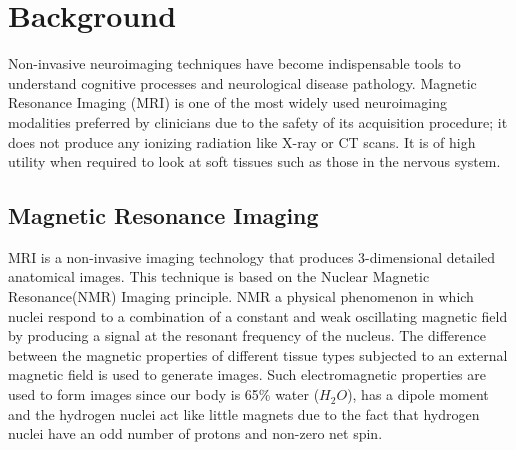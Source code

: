\documentclass[msthesis.tex]{subfiles}
\begin{document}
\chapter{Background}
Non-invasive neuroimaging techniques have become indispensable tools to understand cognitive processes and neurological disease pathology. Magnetic Resonance Imaging (MRI)  is one of the most widely used neuroimaging modalities preferred by clinicians due to the safety of its acquisition procedure; it does not produce any ionizing radiation like X-ray or CT scans. It is of high utility when required to look at soft tissues such as those in the nervous system.

\section{Magnetic Resonance Imaging}
MRI is a non-invasive imaging technology that produces 3-dimensional detailed anatomical images\citep{mcrobbie_moore_graves_prince_2006}. This technique is based on the Nuclear Magnetic Resonance(NMR) Imaging principle. NMR a physical phenomenon in which nuclei respond to a combination of a constant and weak oscillating magnetic field by producing a signal at the resonant frequency of the nucleus. The difference between the magnetic properties of different tissue types subjected to an external magnetic field is used to generate images. Such electromagnetic properties are used to form images since our body is 65\% water ($H_2O$), has a dipole moment and the hydrogen nuclei act like little magnets due to the fact that hydrogen nuclei have an odd number of protons and non-zero net spin. 
\end{document}
